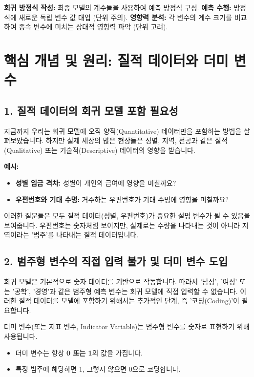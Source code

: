 \documentclass[11pt,a4paper]{book}
\theoremstyle{definition}
\begin{document}
\begin{tcolorbox}[title={\textbf{모델 활용}}]
\textbf{회귀 방정식 작성:} 최종 모델의 계수들을 사용하여 예측 방정식 구성.
\textbf{예측 수행:} 방정식에 새로운 독립 변수 값 대입 (단위 주의).
\textbf{영향력 분석:} 각 변수의 계수 크기를 비교하여 종속 변수에 미치는 상대적 영향력 파악 (단위 고려).
\end{tcolorbox}


\section{핵심 개념 및 원리: 질적 데이터와 더미 변수}

\subsection{1. 질적 데이터의 회귀 모델 포함 필요성}
지금까지 우리는 회귀 모델에 오직 양적(Quantitative) 데이터만을 포함하는 방법을 살펴보았습니다. 하지만 실제 세상의 많은 현상들은 성별, 지역, 전공과 같은 질적(Qualitative) 또는 기술적(Descriptive) 데이터의 영향을 받습니다.

\begin{examplebox}
\textbf{예시:}
\begin{itemize}
    \item \textbf{성별 임금 격차:} 성별이 개인의 급여에 영향을 미칠까요?
    \item \textbf{우편번호와 기대 수명:} 거주하는 우편번호가 기대 수명에 영향을 미칠까요?
\end{itemize}
이러한 질문들은 모두 질적 데이터(성별, 우편번호)가 중요한 설명 변수가 될 수 있음을 보여줍니다. 우편번호는 숫자처럼 보이지만, 실제로는 수량을 나타내는 것이 아니라 지역이라는 '범주'를 나타내는 질적 데이터입니다.
\end{examplebox}

\subsection{2. 범주형 변수의 직접 입력 불가 및 더미 변수 도입}
회귀 모델은 기본적으로 숫자 데이터를 기반으로 작동합니다. 따라서 '남성', '여성' 또는 '공학', '경영'과 같은 범주형 예측 변수는 회귀 모델에 직접 입력할 수 없습니다. 이러한 질적 데이터를 모델에 포함하기 위해서는 추가적인 단계, 즉 '코딩(Coding)'이 필요합니다.

\begin{tcolorbox}[title={더미 변수(Dummy Variable)의 정의}]
더미 변수(또는 지표 변수, Indicator Variable)는 범주형 변수를 숫자로 표현하기 위해 사용됩니다.
\begin{itemize}
    \item 더미 변수는 항상 \textbf{0 또는 1}의 값을 가집니다.
    \item 특정 범주에 해당하면 1, 그렇지 않으면 0으로 코딩합니다.
\end{itemize}
\end{tcolorbox}
\end{document}
